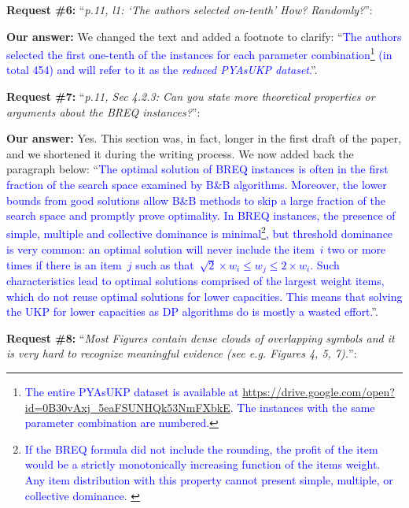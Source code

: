 \documentclass{elsarticle}
\begin{document}
\textbf{Request \#6:} ``\textit{p.11, l1: `The authors selected on-tenth' How? Randomly?}'':

\textbf{Our answer: } We changed the text and added a footnote to clarify: ``\textcolor{blue}{The authors selected the first one-tenth of the instances for each parameter combination\footnote{\textcolor{blue}{The entire PYAsUKP dataset is available at \url{https://drive.google.com/open?id=0B30vAxj_5eaFSUNHQk53NmFXbkE}. The instances with the same parameter combination are numbered.}} (in total 454) and will refer to it as the \emph{reduced PYAsUKP dataset}.}''.
\medskip

\textbf{Request \#7:} ``\textit{p.11, Sec 4.2.3: Can you state more theoretical properties or arguments about the BREQ instances?}'':

\textbf{Our answer:}
Yes.
This section was, in fact, longer in the first draft of the paper, and we shortened it during the writing process.
We now added back the paragraph below:
``\textcolor{blue}{The optimal solution of BREQ instances is often in the first fraction of the search space examined by B\&B algorithms. Moreover, the lower bounds from good solutions allow B\&B methods to skip a large fraction of the search space and promptly prove optimality. In BREQ instances, the presence of simple, multiple and collective dominance is minimal\footnote{\textcolor{blue}{
If the BREQ formula did not include the rounding, the profit of the item would be a strictly monotonically increasing function of the items weight.
Any item distribution with this property cannot present simple, multiple, or collective dominance.
}}, but threshold dominance is very common: an optimal solution will never include the item~\(i\) two or more times if there is an item~\(j\) such as that~\(\sqrt{2} \times w_i \leq w_j \leq 2 \times w_i\).
Such characteristics lead to optimal solutions comprised of the largest weight items, which do not reuse optimal solutions for lower capacities.
This means that solving the UKP for lower capacities as DP algorithms do is mostly a wasted effort.}''.
\medskip

\textbf{Request \#8:} ``\textit{Most Figures contain dense clouds of overlapping symbols and it is very hard to recognize meaningful evidence (see e.g. Figures 4, 5, 7).}'':
\end{document}
